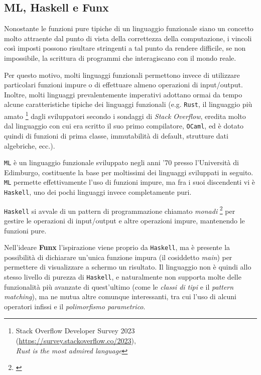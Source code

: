 \subsection{ML, Haskell e Funx}
\label{sec:2-2-ml-haskell-funx}

Nonostante le funzioni pure tipiche di un linguaggio funzionale siano un concetto molto attraente
dal punto di vista della correttezza della computazione, i vincoli così imposti possono risultare
stringenti a tal punto da rendere difficile, se non impossibile, la scrittura di programmi che
interagiscano con il mondo reale.


Per questo motivo, molti linguaggi funzionali permettono invece di utilizzare particolari funzioni
impure o di effettuare almeno operazioni di input/output. Inoltre, molti linguaggi prevalentemente
imperativi adottano ormai da tempo alcune caratteristiche tipiche dei linguaggi funzionali
(e.g. \texttt{Rust}, il linguaggio più amato%
\footnote{Stack Overflow Developer Survey 2023 (\url{https://survey.stackoverflow.co/2023}), \\
    \textit{Rust is the most admired language}}
dagli sviluppatori secondo i sondaggi di \textit{Stack Overflow},
eredita molto dal linguaggio con cui era scritto il suo primo compilatore, \texttt{OCaml}, ed è dotato quindi di
funzioni di prima classe, immutabilità di default, strutture dati algebriche, ecc.).


\texttt{ML} è un linguaggio funzionale sviluppato negli anni '70 presso l'Università di Edimburgo,
costituente la base per moltissimi dei linguaggi sviluppati in seguito.
\texttt{ML} permette effettivamente l'uso di funzioni impure, ma fra i suoi discendenti
vi è \texttt{Haskell}, uno dei pochi linguaggi invece completamente puri.

\noindent \texttt{Haskell} si avvale di un pattern di programmazione chiamato \textit{monadi}%
\footnote{ \cite{Moggi-1991-ComputationMonads}} per gestire
le operazioni di input/output e altre operazioni impure, mantenendo le funzioni pure.


Nell'ideare \textbf{Funx} l'ispirazione viene proprio da \texttt{Haskell}, ma è presente la possibilità
di dichiarare un'unica funzione impura (il cosiddetto \textit{main}) per permettere di visualizzare a schermo un risultato.
Il linguaggio non è quindi allo stesso livello di purezza di \texttt{Haskell}, e naturalmente non supporta
molte delle funzionalità più avanzate di quest'ultimo (come le \textit{classi di tipi} e il \textit{pattern matching}),
ma ne mutua altre comunque interessanti, tra cui l'uso di alcuni operatori infissi e il \textit{polimorfismo parametrico}.